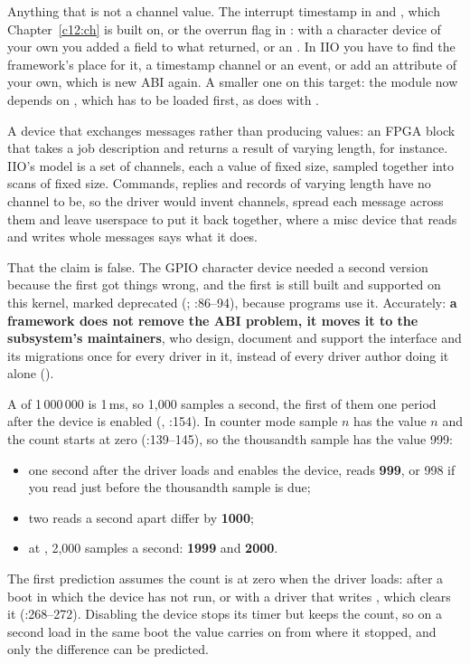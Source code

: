  Anything that is not a channel value. The interrupt timestamp in  and
, which Chapter~\ref{c12:ch} is built on, or the overrun flag in : with a
character device of your own you added a field to what  returned, or an . In
IIO you have to find the framework's place for it, a timestamp channel or an event, or add an
attribute of your own, which is new ABI again. A smaller one on this target: the module now depends
on , which has to be loaded first, as  does with .

 A device that exchanges messages rather than producing values: an FPGA block that takes a
job description and returns a result of varying length, for instance. IIO's model is a set of
channels, each a value of fixed size, sampled together into scans of fixed size. Commands, replies
and records of varying length have no channel to be, so the driver would invent channels, spread
each message across them and leave userspace to put it back together, where a misc device that
reads and writes whole messages says what it does.

 That the claim is false. The GPIO character device needed a second version because the
first got things wrong, and the first is still built and supported on this kernel, marked
deprecated (; :86--94), because programs use
it. Accurately: \textbf{a framework does not remove the ABI problem, it moves it to the subsystem's
maintainers}, who design, document and support the interface and its migrations once for every
driver in it, instead of every driver author doing it alone ().


 A  of 1\,000\,000 is 1\,ms, so 1,000 samples a second, the first of them
one period after the device is enabled (, :154).
In counter mode sample $n$ has the value $n$ and the count starts at zero (:139--145),
so the thousandth sample has the value 999:
\begin{itemize}
  \item one second after the driver loads and enables the device,  reads
    \textbf{999}, or 998 if you read just before the thousandth sample is due;
  \item two reads a second apart differ by \textbf{1000};
  \item at , 2,000 samples a second: \textbf{1999} and \textbf{2000}.
\end{itemize}
The first prediction assumes the count is at zero when the driver loads: after a boot in which the
device has not run, or with a driver that writes , which clears it
(:268--272). Disabling the device stops its timer but keeps the count, so on a second
load in the same boot the value carries on from where it stopped, and only the difference can be
predicted.

